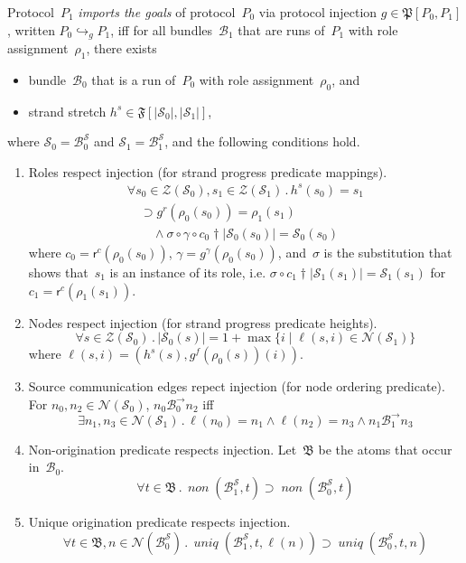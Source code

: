 \documentclass[12pt]{article}
\newcommand{\fn}[1]{\ensuremath{\operatorname{\mathit{#1}}}}
\newcommand{\prefix}[2]{#1\dagger#2}
\newcommand{\all}[1]{\forall#1\mathpunct.}
\newcommand{\some}[1]{\exists#1\mathpunct.}
\newcommand{\alg}[1]{\ensuremath{\mathfrak{#1}}}
\newcommand{\atm}{\alg{B}}
\newcommand{\ssp}{\ensuremath{\mathcal{S}}}
\newcommand{\bun}{\ensuremath{\mathcal{B}}}
\newcommand{\strands}{\ensuremath{\mathcal{Z}}}
\newcommand{\nodes}{\ensuremath{\mathcal{N}}}
\newcommand{\rl}{\ensuremath{\rho}}
\newcommand{\role}{\mathsf{r}}
\begin{document}
Protocol~$P_1$ \emph{imports the goals} of protocol~$P_0$ via
protocol injection $g\in\alg{P}[P_0,P_1]$, written
$P_0\hookrightarrow_g P_1$, iff for all bundles~$\bun_1$ that are runs
of~$P_1$ with role assignment~$\rl_1$, there exists
\begin{itemize}
\item bundle~$\bun_0$ that is a run of~$P_0$ with role
  assignment~$\rl_0$, and
\item strand stretch $h^s\in\alg{F}[|\ssp_0|, |\ssp_1|]$,
\end{itemize}
where $\ssp_0=\bun^\ssp_0$ and $\ssp_1=\bun^\ssp_1$, and the following
conditions hold.
\begin{enumerate}

\item\label{item: role mappings} Roles respect injection (for strand
  progress predicate mappings).
  \[\begin{array}{l}
  \all{s_0\in\strands(\ssp_0),s_1\in\strands(\ssp_1)}h^s(s_0) =
  s_1\\ \quad\supset
  g^r(\rl_0(s_0))=\rl_1(s_1)\\ \qquad{}\land\sigma\circ
  \gamma\circ\prefix{c_0}{|\ssp_0(s_0)|}
  = \ssp_0(s_0)
  \end{array}\]
  where $c_0=\role^c(\rl_0(s_0))$,
  $\gamma=g^\gamma(\rl_0(s_0))$, and~$\sigma$ is the substitution that
  shows that~$s_1$ is an instance of its role, i.e.\@
  $\sigma\circ\prefix{c_1}{|\ssp_1(s_1)|}=\ssp_1(s_1)$ for
  $c_1=\role^c(\rl_1(s_1))$.

\item\label{item: role heights} Nodes respect injection (for strand
  progress predicate heights).
  \[\all{s\in\strands(\ssp_0)}|\ssp_0(s)|=1+\max
  \{i\mid\ell(s,i)\in\nodes(\ssp_1)\}\]
  where $\ell(s,i)=(h^s(s),g^f(\rl_0(s))(i))$.

\item\label{item: node orderings} Source communication edges repect
  injection (for node ordering predicate).  For
  $n_0,n_2\in\nodes(\ssp_0)$, $n_0\mathbin{\bun^\to_0} n_2$ iff
  \[\some{n_1,n_3\in\nodes(\ssp_1)}\ell(n_0)=n_1\land\ell(n_2)=n_3\land
  n_1\mathbin{\bun^\to_1} n_3\]

\item\label{item: nons} Non-origination predicate respects injection.
  Let~$\atm$ be the atoms that occur in~$\bun_0$.
  \[\all{t\in\atm}\fn{non}(\bun_1^\ssp, t)\supset\fn{non}(\bun_0^\ssp, t)\]

\item\label{item: uniques} Unique origination predicate respects injection.
  \[\all{t\in\atm,n\in\nodes(\bun_0^\ssp)}\fn{uniq}(\bun_1^\ssp,
  t,\ell(n))\supset\fn{uniq}(\bun_0^\ssp, t,n)\]
\end{enumerate}
\end{document}

